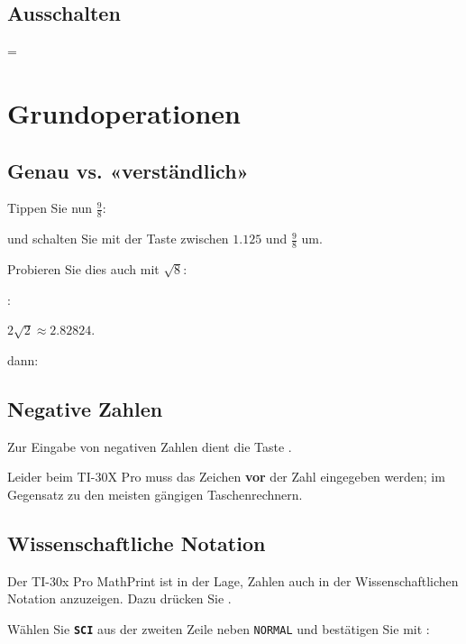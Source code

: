 \subsection{Ausschalten}
  = 
\newpage


\section{Grundoperationen}
\subsection{Genau vs. «verständlich»}\label{approx}

Tippen Sie nun $\frac{9}{8}$:




und schalten Sie mit der
Taste  zwischen $1.125$ und $\frac{9}{8}$ um.


Probieren Sie dies auch mit $\sqrt{8}$:

:

$2\sqrt{2} \approx 2.82824$. 

dann: 


\subsection{Negative Zahlen}
Zur Eingabe von negativen Zahlen dient die Taste .

Leider beim TI-30X Pro muss das
Zeichen \textbf{vor} der Zahl eingegeben werden; im Gegensatz zu den
meisten gängigen Taschenrechnern.


\subsection{Wissenschaftliche Notation}
Der TI-30x Pro MathPrint ist in der Lage, Zahlen auch in der
Wissenschaftlichen Notation anzuzeigen. Dazu drücken
Sie .

Wählen Sie \textbf{\texttt{SCI}} aus der zweiten Zeile
neben \texttt{NORMAL} und bestätigen Sie mit :

